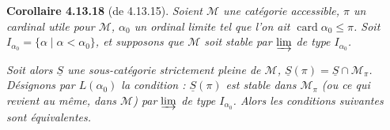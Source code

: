 \documentclass[11pt]{article}
\newcommand{\printedpage}[1]{\marginpar{\footnotesize p.~#1}}
\newcommand{\msp}[1]{\marginpar{\footnotesize [#1]}}
\DeclareMathOperator{\card}{card}
\begin{document}
\printedpage{128}

\msp{page 338}

\textbf{Corollaire 4.13.18} (de 4.13.15). \textit{Soient $\mathcal{M}$ une catégorie accessible, $\pi$ un cardinal utile pour $\mathcal{M}$, $\alpha_0$ un \textup{ordinal limite} tel que l'on ait $\card\alpha_0 \leqslant \pi$. Soit $I_{\alpha_0} = \{\alpha \mid \alpha < \alpha_0\}$, et supposons que $\mathcal{M}$ soit stable par $\varinjlim$ de type $I_{\alpha_0}$.}

\textit{Soit alors $\underline{S}$ une sous-catégorie strictement pleine de $\mathcal{M}$, $\underline{S}(\pi) = \underline{S}\cap\mathcal{M}_\pi$. Désignons par $L(\alpha_0)$ la condition : $\underline{S}(\pi)$ est stable dans $\mathcal{M}_\pi$ (ou ce qui revient au même, dans $\mathcal{M}$) par $\varinjlim$ de type $I_{\alpha_0}$. Alors les conditions suivantes sont équivalentes.}
\end{document}

